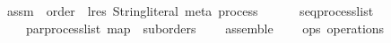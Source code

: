 \isamarkupfalse%
\ assm\ {\isacharcolon}{\isacharcolon}\ {\isachardoublequoteopen}order\ {\isasymRightarrow}\ {\isacharparenleft}lres{\isacharcomma}\ String{\isachardot}literal{\isacharcomma}\ meta{\isacharparenright}\ process{\isachardoublequoteclose}\isanewline
\ \ \ {\isachardoublequoteopen}\ \ {\isacharequal}\ seq{\isacharunderscore}process{\isacharunderscore}list\ \isacharbrackleft\isanewline
\ \ \ \ par{\isacharunderscore}process{\isacharunderscore}list\ {\isacharparenleft}map\ \ {\isacharparenleft}suborders\ \isanewline
\ \ \isacharcomma\ assemble\ \isanewline
\ \ \isacharcomma\ ops\ {\isacharparenleft}operations\ \isacharbrackright{\isachardoublequoteclose}
